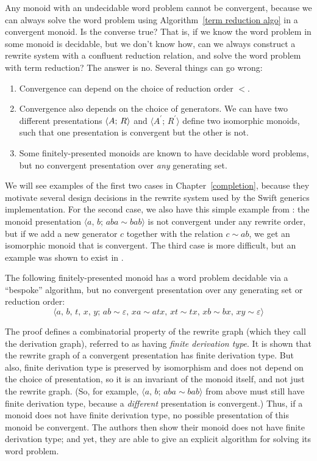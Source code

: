 \documentclass[../generics]{subfiles}
\begin{document}
Any monoid with an undecidable word problem cannot be convergent, because we can always solve the word problem using Algorithm~\ref{term reduction algo} in a convergent monoid. Is the converse true? That is, if we know the word problem in some monoid is decidable, but we don't know how, can we always construct a rewrite system with a confluent reduction relation, and solve the word problem with term reduction? The answer is no. Several things can go wrong:
\begin{enumerate}
\item Convergence can depend on the choice of reduction order $<$.
\item Convergence also depends on the choice of generators. We can have two different presentations $\langle A;\,R\rangle$ and $\langle A^\prime;\,R^\prime\rangle$ define two isomorphic monoids, such that one presentation is convergent but the other is not.
\item Some finitely-presented monoids are known to have decidable word problems, but no convergent presentation over \emph{any} generating set.
\end{enumerate}
We will see examples of the first two cases in Chapter~\ref{completion}, because they motivate several design decisions in the rewrite system used by the Swift generics implementation. For the second case, we also have this simple example from \cite{KAPUR1985337}: the monoid presentation $\langle a,\,b;\,aba\sim bab\rangle$ is not convergent under any rewrite order, but if we add a new generator $c$ together with the relation $c\sim ab$, we get an isomorphic monoid that is convergent. The third case is more difficult, but an example was shown to exist in \cite{SQUIER1994271}.
\begin{theorem} The following finitely-presented monoid has a word problem decidable via a ``bespoke'' algorithm, but no convergent presentation over any generating set or reduction order:
\[\langle a,\,b,\,t,\,x,\,y;\,ab\sim \varepsilon,\,xa\sim atx,\,xt\sim tx,\,xb\sim bx,\,xy\sim \varepsilon\rangle\]
\end{theorem}
The proof defines a combinatorial property of the rewrite graph (which they call the derivation graph), referred to as having \emph{finite derivation type}. It is shown that the rewrite graph of a convergent presentation has finite derivation type. But also, finite derivation type is preserved by isomorphism and does not depend on the choice of presentation, so it is an invariant of the monoid itself, and not just the rewrite graph. (So, for example, $\langle a,\,b;\,aba\sim bab\rangle$ from above must still have finite derivation type, because a \emph{different} presentation is convergent.) Thus, if a monoid does not have finite derivation type, no possible presentation of this monoid be convergent. The authors then show their monoid does not have finite derivation type; and yet, they are able to give an explicit algorithm for solving its word problem.
\end{document}
